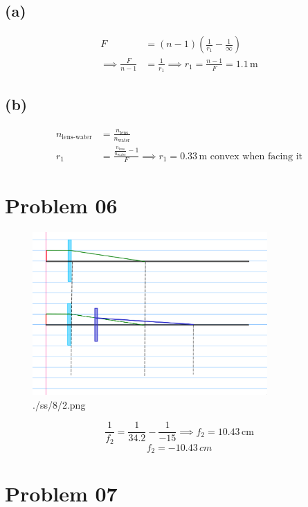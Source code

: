 \documentclass[letter]{article}
\begin{document}
\subsection*{(a)} 
\begin{align*}
	F &= (n-1) \left(\frac{1}{r_1} - \frac{1}{\infty}\right) \\
	  \implies \frac{F}{n-1} &= \frac{1}{r_1} \implies r_1 = \frac{n-1}{F} = 1.1 \, \text{m}
\end{align*}
\subsection*{(b)} 
\begin{align*}
	n_\text{lens-water} &= \frac{n_\text{lens}}{n_\text{water}} \\
	r_1 &= \frac{ \frac{n_\text{lens} }{ n_\text{water} } - 1}{F} \implies r_1 = 0.33 \, \text{m} \text{ convex when facing it}
\end{align*}


\section*{Problem 06} 
\begin{figure}[H]
	\centering
	\includegraphics[width=0.8\textwidth]{./ss/8/2.png}
	\caption{./ss/8/2.png}
	\label{fig:-ss-8-2-png}
\end{figure}
\[
\frac{1}{f_2} = \frac{1}{34.2} - \frac{1}{-15} \implies f_2 = 10.43 \, \text{cm}
\] 
\[
\boxed{
f_2 = - 10.43 \, cm
}
\]

\section*{Problem 07} 
\end{document}
